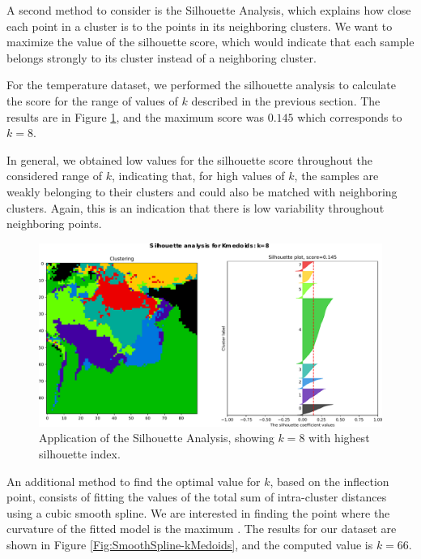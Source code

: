 A second method to consider is the Silhouette Analysis, which explains how close each point in a cluster is to the points in its neighboring clusters. We want to maximize the value of the silhouette score, which would indicate that each sample belongs strongly to its cluster instead of a neighboring cluster.

For the temperature dataset, we performed the silhouette analysis to calculate the score for the range of values of $k$ described in the previous section. The results are in Figure \ref{Fig:Silhouette-kMedoids}, and the maximum score was $0.145$ which corresponds to $k = 8$. 

In general, we obtained low values for the silhouette score throughout the considered range of $k$, indicating that, for high values of $k$, the samples are weakly belonging to their clusters and could also be matched with neighboring clusters. Again, this is an indication that there is low variability throughout neighboring points.

\begin{figure}[h]
	\centering
	\includegraphics[scale=0.50]{../Figures/silhouette-kmedoids_k8_seed0_lite}
	\caption{Application of the Silhouette Analysis, showing $k=8$ with highest silhouette index.}
	\label{Fig:Silhouette-kMedoids}
\end{figure}

An additional method to find the optimal value for $k$, based on the inflection point, consists of fitting the values of the total sum of intra-cluster distances using a cubic smooth spline. We are interested in finding the point where the curvature of the fitted model is the maximum \cite{Akima1970}. The results for our dataset are shown in Figure \ref{Fig:SmoothSpline-kMedoids}, and the computed value is $k = 66$.


